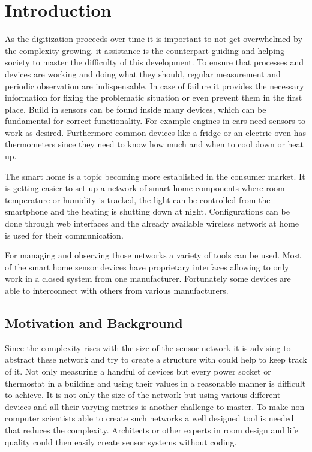 \chapter{Introduction}
As the digitization proceeds over time it is important to not get overwhelmed by the complexity growing. \gls{it} assistance is the counterpart guiding and helping society to master the difficulty of this development. To ensure that processes and devices are working and doing what they should, regular measurement and periodic observation are indispensable. In case of failure it provides the necessary information for fixing the problematic situation or even prevent them in the first place. Build in sensors can be found inside many devices, which can be fundamental for correct functionality. For example engines in cars need sensors to work as desired. Furthermore common devices like a fridge or an electric oven has thermometers since they need to know how much and when to cool down or heat up. 

The smart home is a topic becoming more established in the consumer market. It is getting easier to set up a network of smart home components where room temperature or humidity is tracked, the light can be controlled from the smartphone and the heating is shutting down at night. Configurations can be done through web interfaces and the already available wireless network at home is used for their communication.

For managing and observing those networks a variety of tools can be used. Most of the smart home sensor devices have proprietary interfaces allowing to only work in a closed system from one manufacturer. Fortunately some devices are able to interconnect with others from various manufacturers. 

\section{Motivation and Background}
Since the complexity rises with the size of the sensor network it is advising to abstract these network and try to create a structure with could help to keep track of it. Not only measuring a handful of devices but every power socket or thermostat in a building and using their values in a reasonable manner is difficult to achieve. It is not only the size of the network but using various different devices and all their varying metrics is another challenge to master. To make non computer scientists able to create such networks a well designed tool is needed that reduces the complexity. Architects or other experts in room design and life quality could then easily create sensor systems without coding.


